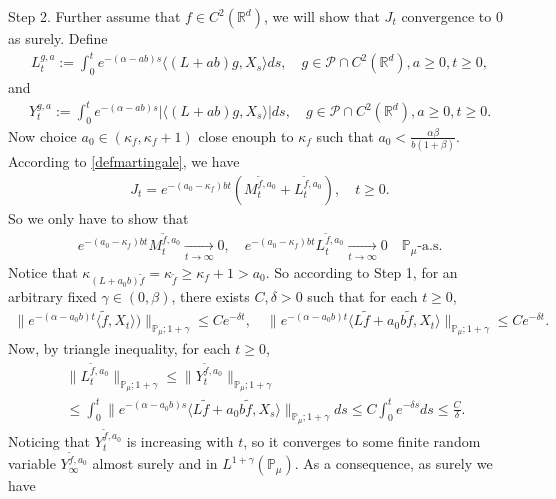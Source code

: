 \documentclass[12pt]{amsart}
\theoremstyle{plain}
\theoremstyle{definition}
\numberwithin{equation}{section}
\begin{document}
	Step 2.
	Further assume that $f\in C^2(\mathbb R^d)$, we will show that $J_t$ convergence to $0$ as surely.
	Define
\begin{align}
	L_t^{g,a}:=\int_0^t e^{-(\alpha-ab)s}\langle (L+ab)g,X_s\rangle ds,
	\quad g\in \mathcal P\cap C^2(\mathbb R^d), a \geq 0, t\geq 0,
\end{align}
and
\begin{align}
    Y_t^{g,a}
    :=\int_0^t e^{-(\alpha-ab)s}|\langle (L+ab)g,X_s\rangle|ds, 
    \quad g\in \mathcal P\cap C^2(\mathbb R^d), a \geq 0, t\geq 0.
\end{align}
	Now choice $a_0 \in (\kappa_{f}, \kappa_f + 1)$ close enouph to $\kappa_f$ such that $a_0 < \frac{\alpha \beta}{b(1+\beta)}$. 
	According to \eqref{defmartingale}, we have
\begin{align*}
    J_t
    =e^{-(a_0-\kappa_f)bt} (M_t^{\tilde{f}, a_0}+L_t^{\tilde{f}, a_0}),
    \quad t\geq 0.
\end{align*}
	So we only have to show that
\begin{align*}
    e^{-(a_0-\kappa_f)b t}M_t^{\tilde{f},a_0}
    \xrightarrow[t\to \infty]{} 0, 
    \quad e^{-(a_0-\kappa_f)b t}L_t^{\tilde{f},a_0}
    \xrightarrow[t\to \infty]{} 0 
    \quad \mathbb{P}_{\mu}\text{-a.s.}
\end{align*}
	Notice that $\kappa_{(L+a_0 b)\tilde{f}}=\kappa_{\tilde{f}}\geq \kappa_f+1 > a_0$.
	So according to Step 1, for an arbitrary fixed $\gamma\in (0,\beta)$, there exists $C, \delta>0$ such that for each $t\geq 0$,
\begin{align}
    \|e^{-(\alpha-a_0 b)t}\langle \tilde{f},X_t\rangle)\|_{\mathbb{P}_{\mu};1+\gamma}
    \leq C e^{-\delta t},
    \quad \|e^{-(\alpha-a_0 b)t}\langle L\tilde{f}+a_0 b\tilde{f},X_t\rangle\|_{\mathbb{P}_{\mu};1+\gamma}
    \leq C e^{-\delta t}.
\end{align}
	Now, by triangle inequality, for each $t\geq 0$,
\begin{align*}
    &\|L_t^{\tilde{f},a_0}\|_{\mathbb{P}_{\mu};1+\gamma}
    \leq\|Y_t^{\tilde{f},a_0}\|_{\mathbb{P}_{\mu};1+\gamma}
    \\&\leq \int_0^t \|e^{-(\alpha-a_0 b)s}\langle L\tilde{f}+a_0 b\tilde{f},X_s\rangle\|_{\mathbb{P}_{\mu};1+\gamma}ds\leq C \int_0^t e^{-\delta s}ds\leq\frac{C}{\delta}.
\end{align*}
	Noticing that $Y_t^{\tilde{f},a_0}$ is increasing with $t$, so it converges to some finite random variable $Y_{\infty}^{\tilde{f},a_0}$ almost surely and in $L^{1+\gamma}(\mathbb{P}_{\mu})$.
	As a consequence, as surely we have
\end{document}
